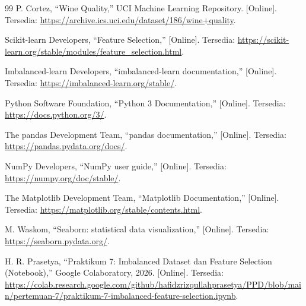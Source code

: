 \documentclass[a4paper,oneside,12pt]{report}
\begin{document}
\begin{thebibliography}{99}
     P. Cortez, ``Wine Quality,'' UCI Machine Learning Repository. [Online]. Tersedia: \url{https://archive.ics.uci.edu/dataset/186/wine+quality}.

     Scikit-learn Developers, ``Feature Selection,'' [Online]. Tersedia: \url{https://scikit-learn.org/stable/modules/feature_selection.html}.

     Imbalanced-learn Developers, ``imbalanced-learn documentation,'' [Online]. Tersedia: \url{https://imbalanced-learn.org/stable/}.

     Python Software Foundation, ``Python 3 Documentation,'' [Online]. Tersedia: \url{https://docs.python.org/3/}.

     The pandas Development Team, ``pandas documentation,'' [Online]. Tersedia: \url{https://pandas.pydata.org/docs/}.

     NumPy Developers, ``NumPy user guide,'' [Online]. Tersedia: \url{https://numpy.org/doc/stable/}.

     The Matplotlib Development Team, ``Matplotlib Documentation,'' [Online]. Tersedia: \url{https://matplotlib.org/stable/contents.html}.

     M. Waskom, ``Seaborn: statistical data visualization,'' [Online]. Tersedia: \url{https://seaborn.pydata.org/}.

     H. R. Prasetya, ``Praktikum 7: Imbalanced Dataset dan Feature Selection (Notebook),'' Google Colaboratory, 2026. [Online]. Tersedia: \url{https://colab.research.google.com/github/hafidzrizqullahprasetya/PPD/blob/main/pertemuan-7/praktikum-7-imbalanced-feature-selection.ipynb}.
\end{thebibliography}
\end{document}
